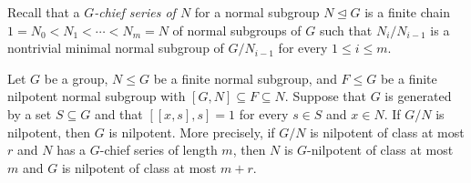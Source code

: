 Recall that a \emph{$G$-chief series of $N$} for a normal subgroup $N\trianglelefteq G$ is a finite chain $1= N_{0}< N_{1}<\cdots< N_{m}=N$ of normal subgroups of $G$ such that $N_i/N_{i-1}$ is a nontrivial minimal normal subgroup of $G/N_{i-1}$ for every $1\leq i \leq m$.

\begin{thm}
\label{theorem:nilpotency ascent theorem for groups}
    Let $G$ be a group, $N\leq G$ be a finite normal subgroup, and $F\leq G$ be a finite nilpotent normal subgroup with $[G,N]\subseteq F\subseteq N$.
    Suppose that $G$ is generated by a set $S\subseteq G$ and that $[[x,s],s]=1$ for every $s\in S$ and $x\in N$.
    If $G/N$ is nilpotent, then $G$ is nilpotent.
    More precisely, if $G/N$ is nilpotent of class at most $r$ and $N$ has a $G$-chief series of length $m$, then $N$ is $G$-nilpotent of class at most $m$ and $G$ is nilpotent of class at most $m+r$.
\end{thm}

